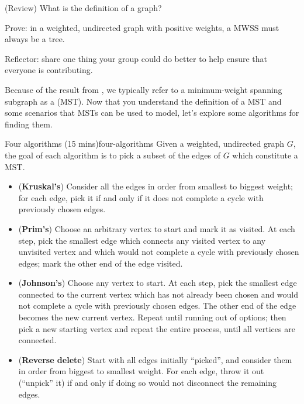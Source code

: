 \documentclass{tufte-handout}
\begin{document}
\begin{questions}
\item (Review) What is the definition of a  graph?
\item \label{q:mwss-tree} Prove: in a weighted, undirected graph with
  positive weights, a MWSS must always be a tree. 
  \vspace{2in}
\item Reflector: share one thing your group could do better to help
  ensure that everyone is contributing.
\end{questions}

\pause

Because of the result from , we typically refer to
a minimum-weight spanning subgraph as a 
(MST).  Now that you understand the definition of a MST and some
scenarios that MSTs can be used to model, let's explore some
algorithms for finding them.

\begin{model*}{Four algorithms (15 mins)}{four-algorithms}
  Given a weighted, undirected graph $G$, the goal of each algorithm
  is to pick a subset of the edges of $G$ which constitute a MST.
  \begin{itemize}
  \item (\textbf{Kruskal's}) Consider all the edges in order from
    smallest to biggest weight; for each edge, pick it if and only if
    it does not complete a cycle with previously chosen edges.
  \item (\textbf{Prim's}) Choose an arbitrary vertex to start and mark
    it as visited.  At each step, pick the smallest edge which
    connects any visited vertex to any unvisited vertex and which would
    not complete a cycle with previously chosen edges; mark the other
    end of the edge visited.
  \item (\textbf{Johnson's}) Choose any vertex to start.  At each
    step, pick the smallest edge connected to the current vertex which
    has not already been chosen and would not complete a cycle with
    previously chosen edges.  The other end of the edge becomes the
    new current vertex.  Repeat until running out of options; then
    pick a new starting vertex and repeat the entire process, until
    all vertices are connected.
  \item (\textbf{Reverse delete}) Start with all edges initially
    ``picked'', and consider them in order from biggest to smallest
    weight.  For each edge, throw it out (\ie ``unpick'' it) if and
    only if doing so would not disconnect the remaining edges.
  \end{itemize}
\end{model*}
\end{document}
